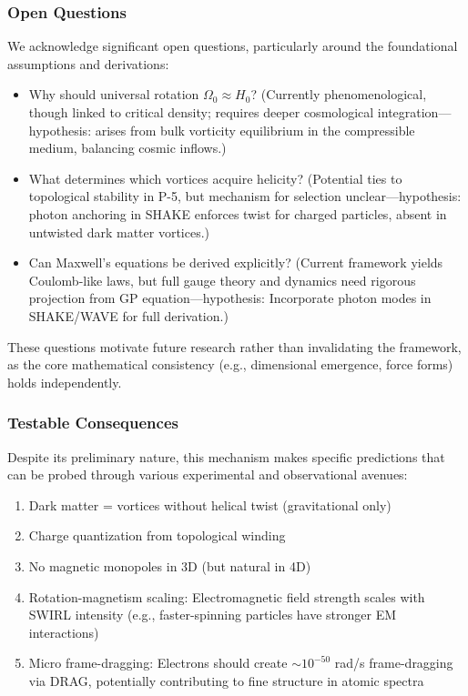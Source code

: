 \subsubsection{Open Questions}
We acknowledge significant open questions, particularly around the foundational assumptions and derivations:
\begin{itemize}
\item Why should universal rotation $\Omega_0 \approx H_0$? (Currently phenomenological, though linked to critical density; requires deeper cosmological integration---hypothesis: arises from bulk vorticity equilibrium in the compressible medium, balancing cosmic inflows.)
\item What determines which vortices acquire helicity? (Potential ties to topological stability in P-5, but mechanism for selection unclear---hypothesis: photon anchoring in SHAKE enforces twist for charged particles, absent in untwisted dark matter vortices.)
\item Can Maxwell's equations be derived explicitly? (Current framework yields Coulomb-like laws, but full gauge theory and dynamics need rigorous projection from GP equation---hypothesis: Incorporate photon modes in SHAKE/WAVE for full derivation.)
\end{itemize}
These questions motivate future research rather than invalidating the framework, as the core mathematical consistency (e.g., dimensional emergence, force forms) holds independently.

\subsubsection{Testable Consequences}
Despite its preliminary nature, this mechanism makes specific predictions that can be probed through various experimental and observational avenues:
\begin{enumerate}
\item Dark matter = vortices without helical twist (gravitational only)
\item Charge quantization from topological winding
\item No magnetic monopoles in 3D (but natural in 4D)
\item Rotation-magnetism scaling: Electromagnetic field strength scales with SWIRL intensity (e.g., faster-spinning particles have stronger EM interactions)
\item Micro frame-dragging: Electrons should create $\sim 10^{-50}$ rad/s frame-dragging via DRAG, potentially contributing to fine structure in atomic spectra
\end{enumerate}


